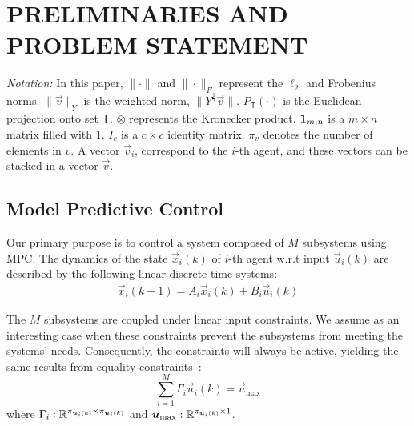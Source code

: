 \documentclass[a4paper, 10 pt, conference]{ieeeconf}  %
\begin{document}
\section{PRELIMINARIES AND PROBLEM STATEMENT}\label{sec:PS}
\emph{Notation:} In this paper, $\|\cdot\|$ and $\|\cdot\|_{F}$ represent the $\ell_{2}$ and Frobenius norms. $\|\vec{v}\|_{Y}$ is the weighted norm, $\|Y^{\frac{1}{2}}\vec{v}\|$.
$P_{\mathsf{T}}(\cdot)$ is the Euclidean projection onto set $\mathsf{T}$.
$\otimes$ represents the Kronecker product. $\mathbf{1}_{m,n}$ is a ${m\times n}$ matrix filled with $1$.
$I_{c}$ is a ${c\times c}$ identity matrix.
$\pi_{v}$ denotes the number of elements in $v$.
A vector $\vec{v}_{i}$, correspond to the $i$-th agent, and these vectors can be stacked in a vector $\vec{v}$.

\subsection{Model Predictive Control}\label{ssec:MPC}
Our primary purpose is to control a system composed of $M$ subsystems using MPC\@.
The dynamics of the state ${\vec{x}_{i}(k)}$ of $i$-th agent w.r.t
input ${\vec{u}_{i}(k)}$ are described by the following linear discrete-time systems:
\begin{equation}
\begin{matrix}
  \label{eq:systems}
\vec{x}_{i}(k+1)=A_{i}\vec{x}_{i}(k) + B_{i}\vec{u}_{i}(k)
\end{matrix}
\end{equation}


The $M$ subsystems are coupled under linear input constraints.
We assume as an interesting case when these constraints prevent the subsystems from meeting the systems' needs. Consequently, the constraints will always be active, yielding the same results from equality constraints~\cite{BoydVandenberghe2004}:
\begin{equation}
  \label{eq:constraint}
  \sum^{M}_{i=1}\Gamma_{i}\vec{u}_{i}(k)=\vec{u}_{\mathrm{\max}}
\end{equation}
where $\Gamma_{i}:\mathbb{R}^{\pi_{\bm{u}_{i}(k)}\times \pi_{\bm{u}_{i}(k)}}$ and $\bm{u}_{\mathrm{max}}:\mathbb{R}^{\pi_{\bm{u}_{i}(k)}\times 1}$.
\end{document}
